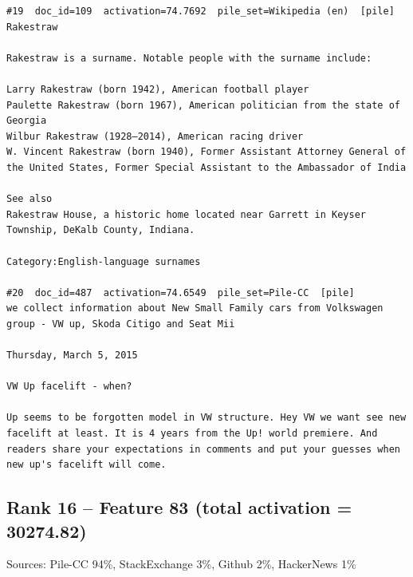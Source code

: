 \begin{verbatim}
#19  doc_id=109  activation=74.7692  pile_set=Wikipedia (en)  [pile]
Rakestraw

Rakestraw is a surname. Notable people with the surname include:

Larry Rakestraw (born 1942), American football player
Paulette Rakestraw (born 1967), American politician from the state of Georgia
Wilbur Rakestraw (1928–2014), American racing driver
W. Vincent Rakestraw (born 1940), Former Assistant Attorney General of the United States, Former Special Assistant to the Ambassador of India

See also
Rakestraw House, a historic home located near Garrett in Keyser Township, DeKalb County, Indiana.

Category:English-language surnames

#20  doc_id=487  activation=74.6549  pile_set=Pile-CC  [pile]
we collect information about New Small Family cars from Volkswagen group - VW up, Skoda Citigo and Seat Mii

Thursday, March 5, 2015

VW Up facelift - when?

Up seems to be forgotten model in VW structure. Hey VW we want see new facelift at least. It is 4 years from the Up! world premiere. And readers share your expectations in comments and put your guesses when new up's facelift will come.

\end{verbatim}

\subsection*{Rank 16 -- Feature 83 (total activation = 30274.82)}

Sources: Pile-CC 94\%, StackExchange 3\%, Github 2\%, HackerNews 1\%

